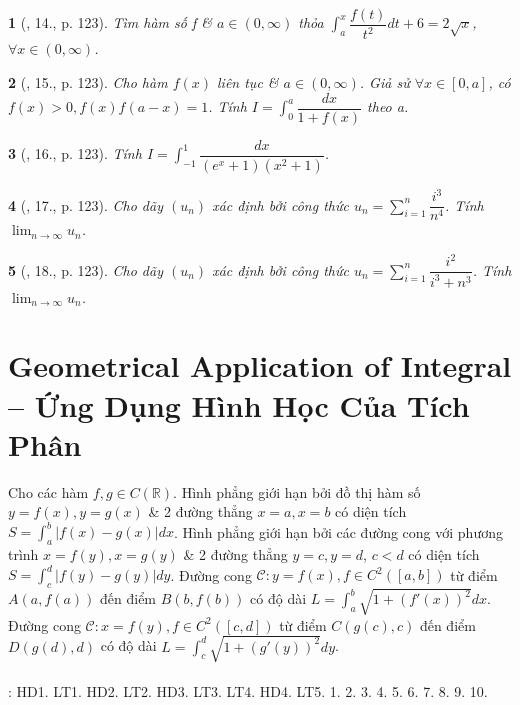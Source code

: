 \documentclass{article}
\newtheorem{baitoan}{}
\begin{document}
\begin{baitoan}[\cite{TLCT_giai_tich_12}, 14., p. 123]
	Tìm hàm số f \& $a\in(0,\infty)$ thỏa $\int_a^x \dfrac{f(t)}{t^2}dt + 6 = 2\sqrt{x}$, $\forall x\in(0,\infty)$.
\end{baitoan}

\begin{baitoan}[\cite{TLCT_giai_tich_12}, 15., p. 123]
	Cho hàm $f(x)$ liên tục \& $a\in(0,\infty)$. Giả sử $\forall x\in[0,a]$, có $f(x) > 0,f(x)f(a - x) = 1$. Tính $I = \int_0^a \dfrac{dx}{1 + f(x)}$ theo a.
\end{baitoan}

\begin{baitoan}[\cite{TLCT_giai_tich_12}, 16., p. 123]
	Tính $I = \int_{-1}^1 \dfrac{dx}{(e^x + 1)(x^2 + 1)}$.
\end{baitoan}

\begin{baitoan}[\cite{TLCT_giai_tich_12}, 17., p. 123]
	Cho dãy $(u_n)$ xác định bởi công thức $u_n = \sum_{i=1}^n \dfrac{i^3}{n^4}$. Tính $\lim_{n\to\infty} u_n$.
\end{baitoan}

\begin{baitoan}[\cite{TLCT_giai_tich_12}, 18., p. 123]
	Cho dãy $(u_n)$ xác định bởi công thức $u_n = \sum_{i=1}^n \dfrac{i^2}{i^3 + n^3}$. Tính $\lim_{n\to\infty} u_n$.
\end{baitoan}


\section{Geometrical Application of Integral -- Ứng Dụng Hình Học Của Tích Phân}
Cho các hàm $f,g\in C(\mathbb{R})$.  Hình phẳng giới hạn bởi đồ thị hàm số $y = f(x),y = g(x)$ \& 2 đường thẳng $x = a,x = b$ có diện tích $S = \int_a^b |f(x) - g(x)|dx$.  Hình phẳng giới hạn bởi các đường cong với phương trình $x = f(y),x = g(y)$ \& 2 đường thẳng $y = c,y = d$, $c < d$ có diện tích $S = \int_c^d |f(y) - g(y)|dy$.  Đường cong $\mathcal{C}:y = f(x),f\in C^2([a,b])$ từ điểm $A(a,f(a))$ đến điểm $B(b,f(b))$ có độ dài $L = \int_a^b \sqrt{1 + (f'(x))^2}dx$.  Đường cong $\mathcal{C}:x = f(y),f\in C^2([c,d])$ từ điểm $C(g(c),c)$ đến điểm $D(g(d),d)$ có độ dài $L = \int_c^d \sqrt{1 + (g'(y))^2}dy$.\\
\\
\cite[Chap. IV, \S4, pp. 28--41]{SGK_Toan_12_Canh_Dieu_tap_2}: HD1. LT1. HD2. LT2. HD3. LT3. LT4. HD4. LT5. 1. 2. 3. 4. 5. 6. 7. 8. 9. 10.
\end{document}
